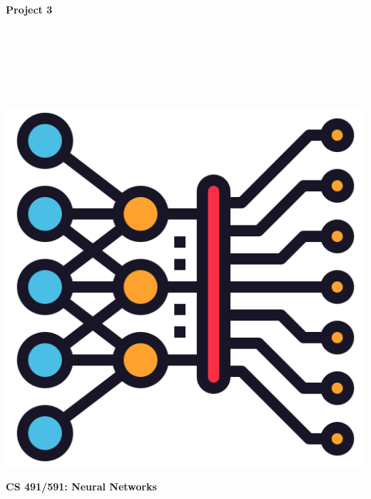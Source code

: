 \documentclass{article}
\begin{document}
\begin{titlepage}
\begin{center}
\vspace*{1cm}
            
\Huge
\textbf{Project 3}
            
\vspace{1cm}

\Large
{}

\vspace{2cm}

 \\
 \\
 \\
 \\
 \\

\vspace{2cm}

\includegraphics[scale=0.25]{figs/icon.png}\\[0.5cm]

\vspace{9cm}

\textbf{CS 491/591: Neural Networks} \\

\end{center}
\end{titlepage}
\newpage
\end{document}
